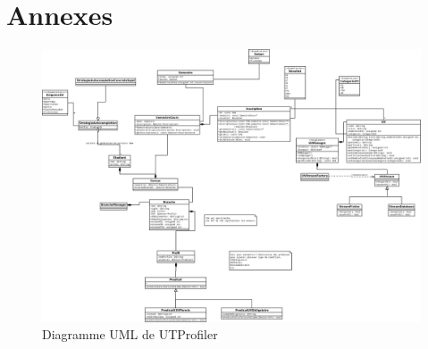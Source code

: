 \documentclass[a4paper,10pt,french]{report}
\begin{document}


%
%

\appendix
\section*{Annexes}\label{sec:Annexes}
	\begin{figure}[!h]
				\begin{center}
					\caption{\label{fig:diag} Diagramme UML de UTProfiler}
					\includegraphics[scale=0.18]{utprofiler}
				\end{center}
			\end{figure}
            
\end{document}
